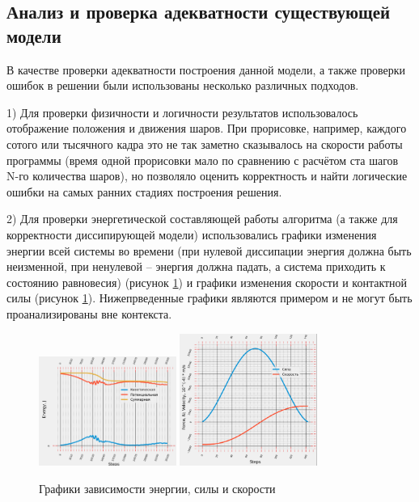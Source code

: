 \documentclass[a4paper]{article}
\begin{document}
\subsection{Анализ и проверка адекватности существующей модели}

В качестве проверки адекватности построения данной модели, а также проверки ошибок в решении были использованы несколько различных подходов.

1) Для проверки физичности и логичности результатов использовалось отображение положения и движения шаров.
При прорисовке, например, каждого сотого или тысячного кадра это не так заметно сказывалось на скорости работы программы (время одной прорисовки мало по сравнению с расчётом ста шагов N-го количества шаров), но позволяло оценить корректность и найти логические ошибки на самых ранних стадиях построения решения.

2) Для проверки энергетической составляющей работы алгоритма (а также для корректности диссипирующей модели) использовались графики изменения энергии всей системы во времени (при нулевой диссипации энергия должна быть неизменной, при ненулевой -- энергия должна падать, а система приходить к состоянию равновесия) (рисунок \ref{pic:graphs}) и графики изменения скорости и контактной силы (рисунок \ref{pic:graphs}). Нижепрведенные графики являются примером и не могут быть проанализированы вне контекста.


\begin{figure}[h!]
	\centering
	\label{pic:graphs}
	\includegraphics[width=0.4\textwidth]{graph1} 
	\includegraphics[width=0.4\textwidth]{graph2}
	\caption{Графики зависимости энергии, силы и скорости}
\end{figure} 
\end{document}
